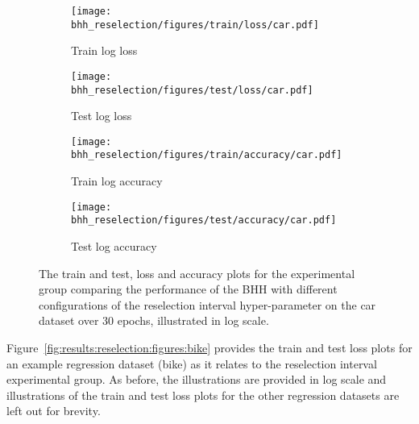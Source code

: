 \begin{figure}[htbp]
      \begin{subfigure}{0.5\textwidth}
            \centering
            \texttt{[image: bhh\_reselection/figures/train/loss/car.pdf]}
            \caption{Train log loss}
            \label{fig:results:reselection:figures:loss:train:car}
      \end{subfigure}
      \begin{subfigure}{0.5\textwidth}
            \centering
            \texttt{[image: bhh\_reselection/figures/test/loss/car.pdf]}
            \caption{Test log loss}
            \label{fig:results:reselection:figures:loss:test:car}
      \end{subfigure}
      \par\bigskip
      \begin{subfigure}{0.5\textwidth}
            \centering
            \texttt{[image: bhh\_reselection/figures/train/accuracy/car.pdf]}
            \caption{Train log accuracy}
            \label{fig:results:reselection:figures:accuracy:train:car}
      \end{subfigure}
      \begin{subfigure}{0.5\textwidth}
            \centering
            \texttt{[image: bhh\_reselection/figures/test/accuracy/car.pdf]}
            \caption{Test log accuracy}
            \label{fig:results:reselection:figures:accuracy:test:car}
      \end{subfigure}
      \par\bigskip
      \caption{The train and test, loss and accuracy plots for the experimental group comparing the performance of the \acs{BHH} with different configurations of the reselection interval hyper-parameter on the car dataset over 30 epochs, illustrated in log scale.}
      \label{fig:results:reselection:figures:car}
\end{figure}

Figure~\ref{fig:results:reselection:figures:bike} provides the train and test loss plots for an example regression dataset (bike) as it relates to the reselection interval experimental group. As before, the illustrations are provided in log scale and illustrations of the train and test loss plots for the other regression datasets are left out for brevity.

